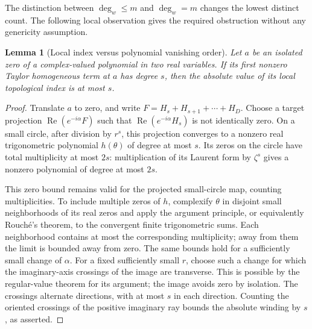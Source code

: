 \documentclass[UTF8,11pt]{ctexart}
\newtheorem{lem}[thm]{Lemma}
\theoremstyle{definition}
\numberwithin{equation}{section}
\DeclareMathOperator{\Rea}{Re}\DeclareMathOperator{\Ima}{Im}
\begin{document}
The distinction between $\deg_w\le m$ and $\deg_w=m$ changes
the lowest distinct count. The following local observation gives
the required obstruction without any genericity assumption.

\begin{lem}[Local index versus polynomial vanishing order]
\label{v7:lem:order}
Let $a$ be an isolated zero of a complex-valued polynomial in
two real variables. If its first nonzero Taylor homogeneous term
at $a$ has degree $s$, then the absolute value of its local
topological index is at most $s$.
\end{lem}
\begin{proof}
Translate $a$ to zero, and write $F=H_s+H_{s+1}+\cdots+H_D$.
Choose a target projection $\Rea(e^{-i\alpha}F)$ such that
$\Rea(e^{-i\alpha}H_s)$ is not identically zero. On a small
circle, after division by $r^s$, this projection converges to
a nonzero real trigonometric polynomial $h(\theta)$ of degree
at most $s$. Its zeros on the circle have total multiplicity
at most $2s$: multiplication of its Laurent form by $\zeta^s$
gives a nonzero polynomial of degree at most $2s$.

This zero bound remains valid for the projected small-circle
map, counting multiplicities. To include multiple zeros of $h$,
complexify $\theta$ in disjoint small neighborhoods of its real
zeros and apply the argument principle, or equivalently
Rouch\'e's theorem, to the convergent finite trigonometric sums.
Each neighborhood contains at most the corresponding multiplicity;
away from them the limit is bounded away from zero. The same
bounds hold for a sufficiently small change of $\alpha$.
For a fixed sufficiently small $r$, choose such a change for
which the imaginary-axis crossings of the image are transverse.
This is possible by the regular-value theorem for its argument;
the image avoids zero by isolation. The crossings alternate
directions, with at most $s$ in each direction. Counting the
oriented crossings of the positive imaginary ray bounds the
absolute winding by $s$, as asserted.
\end{proof}
\end{document}
